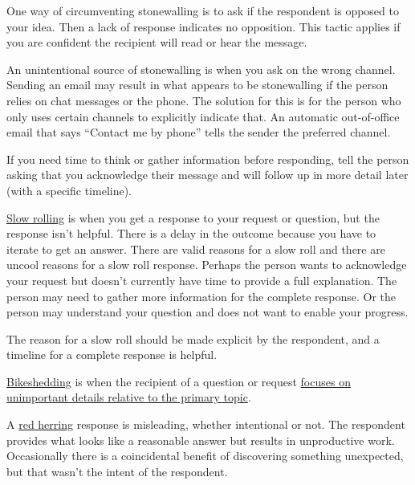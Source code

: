 One way of circumventing stonewalling is to ask if the respondent is opposed to your idea. Then a lack of response indicates no opposition. This tactic applies if you are confident the recipient will read or hear the message.

An unintentional source of stonewalling is when you ask on the wrong channel. Sending an email may result in what appears to be stonewalling if the person relies on chat messages or the phone. The solution for this  is for the person who only uses certain channels to explicitly indicate that. An automatic out-of-office email that says ``Contact me by phone'' tells the sender the preferred channel.

If you need time to think or gather information before responding,  tell the person asking that you acknowledge their message and will follow up in more detail later (with a specific timeline). 

\underline{Slow rolling} is when you get a response to your request or question, but the response isn't helpful. There is a delay in the outcome because you have to iterate to get an answer. There are valid reasons for a slow roll and there are uncool reasons for a slow roll response. Perhaps the person wants to acknowledge your request but doesn't currently have time to provide a full explanation. The person may need to gather more information for the complete response. Or the person may understand your question and does not want to enable your progress. 

The reason for a slow roll should be made explicit by the respondent, and a timeline for a complete response is helpful. 

\underline{Bikeshedding} is when the recipient of a question or request \href{https://en.wikipedia.org/wiki/Law_of_triviality}{focuses on unimportant details relative to the primary topic}. 

A \underline{red herring} response is misleading, whether intentional or not. The respondent provides what looks like a reasonable answer but results in unproductive work. Occasionally there is a coincidental benefit of discovering something unexpected, but that wasn't the intent of the respondent. 


